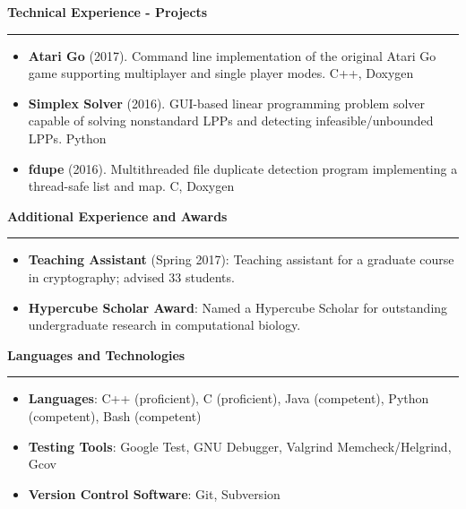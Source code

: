 \documentclass[10pt,letterpaper]{article}
\begin{document}
\medskip

\begin{large}
	\textbf{Technical Experience - Projects}
\end{large}

\smallskip \hrule \smallskip

\begin{itemize}[topsep=0pt]
	\setlength\itemsep{-0.10em}
	\item \textbf{Atari Go} (2017). Command line implementation of the original Atari
	      Go game supporting multiplayer and single player modes. C++, Doxygen
	\item \textbf{Simplex Solver} (2016). GUI-based linear programming problem solver
	      capable of solving nonstandard LPPs and detecting infeasible/unbounded LPPs. Python
	\item \textbf{fdupe} (2016). Multithreaded file duplicate detection program implementing
	      a thread-safe list and map. C, Doxygen
\end{itemize}

\medskip

\begin{large}
	\textbf{Additional Experience and Awards}
\end{large}

\smallskip \hrule \smallskip

\begin{itemize}[topsep=0pt]
	\setlength\itemsep{-0.10em}
	\item \textbf{Teaching Assistant} (Spring 2017): Teaching assistant for a graduate course
	      in cryptography; advised 33 students.
	\item \textbf{Hypercube Scholar Award}: Named a Hypercube Scholar for outstanding
	      undergraduate research in computational biology.
\end{itemize}

\medskip

\begin{large}
	\textbf{Languages and Technologies}
\end{large}

\smallskip \hrule \smallskip

\begin{itemize}[topsep=0pt]
	\setlength\itemsep{-0.10em}
	\item \textbf{Languages}: C++ (proficient), C (proficient), Java (competent), Python (competent), Bash (competent)
	\item \textbf{Testing Tools}: Google Test, GNU Debugger, Valgrind Memcheck/Helgrind, Gcov
	\item \textbf{Version Control Software}: Git, Subversion
\end{itemize}
\end{document}
